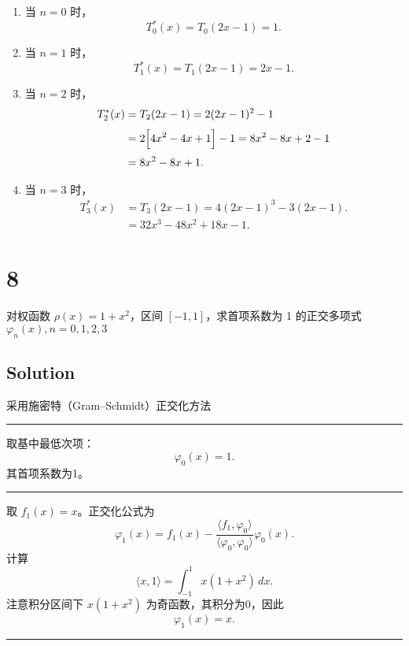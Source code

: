 \documentclass[11pt]{article}
\begin{document}
\begin{enumerate}
\def\labelenumi{\arabic{enumi}.}
\item
  当 \(n=0\) 时， \[
  T^*_0(x)=T_0(2x-1)=1.
  \]
\item
  当 \(n=1\) 时， \[
  T^*_1(x)=T_1(2x-1)=2x-1.
  \]
\item
  当 \(n=2\) 时， \[
  \begin{aligned}
  T^*_2(x)&=T_2(2x-1)=2(2x-1)^2-1\\[1mm]
  &=2\Bigl[4x^2-4x+1\Bigr]-1=8x^2-8x+2-1\\[1mm]
  &=8x^2-8x+1.
  \end{aligned}
  \]
\item
  当 \(n=3\) 时， \[
  \begin{aligned}
  T^*_3(x)&=T_3(2x-1)=4(2x-1)^3-3(2x-1).\\[1mm]
  &=32x^3-48x^2+18x-1.
  \end{aligned}
  \]
\end{enumerate}

    \section{8}\label{section}

对权函数 \(\rho (x) = 1 + x^2\)，区间 \([-1, 1]\)，求首项系数为 1
的正交多项式 \(\varphi_n(x), n = 0,1,2,3\)

    \subsection{Solution}\label{solution}

采用施密特（Gram--Schmidt）正交化方法

\begin{center}\rule{0.5\linewidth}{0.5pt}\end{center}

取基中最低次项： \[
\varphi_0(x)=1.
\] 其首项系数为1。

\begin{center}\rule{0.5\linewidth}{0.5pt}\end{center}

取 \(f_1(x)=x\)。正交化公式为 \[
\varphi_1(x)=f_1(x)-\frac{\langle f_1, \varphi_0\rangle}{\langle \varphi_0,\varphi_0\rangle}\varphi_0(x).
\] 计算 \[
\langle x,1\rangle=\int_{-1}^{1}x(1+x^2)\,dx.
\] 注意积分区间下 \(x(1+x^2)\) 为奇函数，其积分为0，因此 \[
\varphi_1(x)=x.
\]

\begin{center}\rule{0.5\linewidth}{0.5pt}\end{center}
\end{document}
